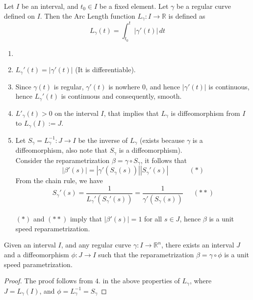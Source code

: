 \vspace{0.4cm}
\begin{definition}
    Let $I$ be an interval, and $t_{0}\in I$ be a fixed element. Let $\gamma$ be a regular curve defined on $I$. Then the Arc Length function $L_{\gamma}:I\to\mathbb{R}$ is defined as $$L_{\gamma}(t)=\int_{t_{0}}^{t}|\gamma'(t)|\,dt$$
\end{definition}
\vspace{0.4cm}
\begin{property}
    \begin{enumerate}
        \item []
        \item $L_{\gamma}'(t)=|\gamma'(t)|$ (It is differentiable).
        \item Since $\gamma(t)$ is regular, $\gamma'(t)$ is nowhere $0$, and hence $|\gamma'(t)|$ is continuous, hence $L_{\gamma}'(t)$ is continuous and consequently, smooth.
        \item $L'_{\gamma}(t)>0$ on the interval $I$, that implies that $L_{\gamma}$ is diffeomorphism from $I$ to $L_{\gamma}(I):=J$.
        \item Let $S_{\gamma}=L_{\gamma}^{-1}:J\to I$ be the inverse of $L_{\gamma}$ (exists because $\gamma$ is a diffeomorphism, also note that $S_{\gamma}$ is a diffeomorphism).\\ 
            Consider the reparametrization $\beta=\gamma\circ S_{\gamma}$, it follows that $$|\beta'(s)|=|\gamma'(S_{\gamma}(s))||S_{\gamma}'(s)|\quad\quad\quad(*)$$
            From the chain rule, we have $$S_{\gamma}'(s)=\frac{1}{L_{\gamma}'(S_{\gamma}'(s))}=\frac{1}{\gamma'(S_{\gamma}(s))}\quad~~(**)$$\\ 
            $(*)$ and $(**)$ imply that $|\beta'(s)|=1$ for all $s\in J$, hence $\beta$ is a unit speed reparametrization.
    \end{enumerate}
\end{property}
\vspace{0.4cm}
\begin{theorem}[]
    Given an interval $I$, and any regular curve $\gamma:I\to\mathbb{R}^{n}$, there exists an interval $J$ and a diffeomorphism $\phi:J\to I$ such that the reparametrization $\beta=\gamma\circ\phi$ is a unit speed parametrization.
\end{theorem}
\begin{proof}
    The proof follows from $4.$ in the above properties of $L_{\gamma}$, where\\
    $J = L_{\gamma}(I)$, and $\phi = L_{\gamma}^{-1}=S_{\gamma}$
\end{proof}
\vspace{0.4cm}
